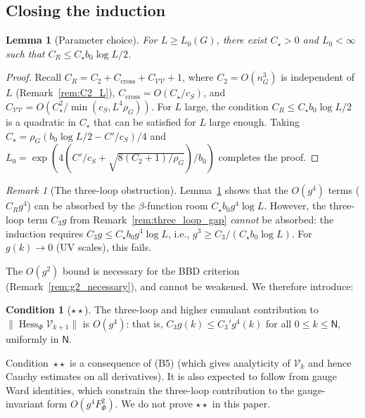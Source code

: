 \documentclass[11pt,a4paper]{article}
\theoremstyle{plain}
\newtheorem{lemma}[theorem]{Lemma}
\theoremstyle{definition}
\newtheorem{condition}[theorem]{Condition}
\theoremstyle{remark}
\newtheorem{remark}[theorem]{Remark}
\newcommand{\Hess}{\operatorname{Hess}}
\newcommand{\cV}{\mathcal{V}}
\begin{document}
\subsection{Closing the induction}

\begin{lemma}[Parameter choice]\label{lem:params}
For $L \ge L_0(G)$, there exist $C_\star > 0$ and
$L_0 < \infty$ such that $C_R \le C_\star b_0\log L/2$.
\end{lemma}

\begin{proof}
Recall $C_R = C_2 + C_{\mathrm{cross}} + C_{\cV\cV} + 1$,
where $C_2 = O(n_G^3)$ is independent of $L$
(Remark~\ref{rem:C2_L}),
$C_{\mathrm{cross}} = O(C_\star/c_S)$, and
$C_{\cV\cV} = O(C_\star^2/\min(c_S, L^4\rho_G))$.
For $L$ large, the condition
$C_R \le C_\star b_0\log L/2$ is a quadratic in $C_\star$
that can be satisfied for $L$ large enough. Taking
$C_\star = \rho_G(b_0\log L/2 - C'/c_S)/4$
and $L_0 = \exp(4(C'/c_S
+ \sqrt{8(C_2+1)/\rho_G})/b_0)$ completes the proof.
\end{proof}

\begin{remark}[The three-loop obstruction]
\label{rem:three_loop_obstruction}
Lemma~\ref{lem:params} shows that the $O(g^4)$ terms
($C_R g^4$) can be absorbed by the $\beta$-function room
$C_\star b_0 g^4\log L$. However, the three-loop term
$C_3 g$ from Remark~\ref{rem:three_loop_gap} \emph{cannot}
be absorbed: the induction requires
$C_3 g \le C_\star b_0 g^4\log L$, i.e.,
$g^3 \ge C_3/(C_\star b_0\log L)$. For $g(k) \to 0$
(UV scales), this fails.

The $O(g^2)$ bound is necessary for the BBD criterion
(Remark~\ref{rem:g2_necessary}), and cannot be weakened.
We therefore introduce:
\end{remark}

\begin{condition}[$\star\star$]\label{cond:starstar}
The three-loop and higher cumulant contribution to
$\|\Hess_\Phi\cV_{k+1}\|$ is $O(g^4)$: that is,
$C_3 g(k) \le C_3' g^4(k)$ for all $0 \le k \le \mathsf{N}$,
uniformly in $\mathsf{N}$.
\end{condition}

Condition~$\star\star$ is a consequence of (B5)
(which gives analyticity of $\cV_k$ and hence
Cauchy estimates on all derivatives). It is also
expected to follow from gauge Ward identities,
which constrain the three-loop contribution to the
gauge-invariant form $O(g^4 F_\Phi^2)$.
We do not prove $\star\star$ in this paper.
\end{document}
